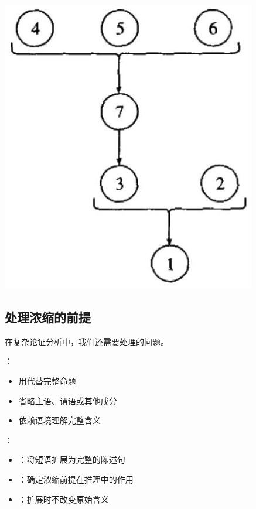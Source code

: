 \begin{center}
\includegraphics[width=\textwidth]{images/2025_05_15_6a28331d5e7c993ad07ag-073.jpg}
\end{center}

\subsection{处理浓缩的前提}

在复杂论证分析中，我们还需要处理的问题。

\begin{theorembox}[title=浓缩前提的特征与处理]
：
\begin{itemize}
  \item 用代替完整命题
  \item 省略主语、谓语或其他成分
  \item 依赖语境理解完整含义
\end{itemize}

：
\begin{itemize}
  \item {}：将短语扩展为完整的陈述句
  \item {}：确定浓缩前提在推理中的作用
  \item {}：扩展时不改变原始含义
\end{itemize}
\end{theorembox}

